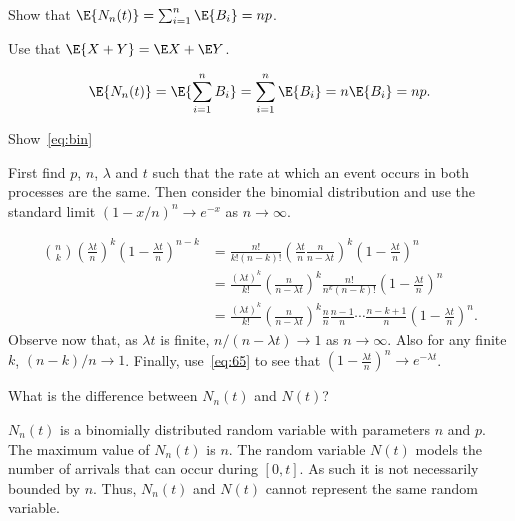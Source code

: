 \begin{exercise}\label{ex:p1}
Show that $\E{N_n(t)} = \sum_{i=1}^n \E{B_i} = n p$.
\begin{hint}
Use that $\E{X+Y} = \E X + \E Y$.
\end{hint}
\begin{solution}
 \begin{equation*}
 \E{N_n(t)} = \E{\sum_{i=1}^n {B_i}} = \sum_{i=1}^n \E{B_i} = n \E{B_i} = n p.
 \end{equation*}
\end{solution}
\end{exercise}

\begin{exercise} \label{ex:31}
 Show~\cref{eq:bin}
\begin{hint}
 First find $p$, $n$, $\lambda$ and $t$ such that the rate at which an event occurs in both processes are the same.
 Then consider the binomial distribution and use the standard limit $(1-x/n)^n \to e^{-x}$ as $n\to \infty$.
\end{hint}
\begin{solution}
 \begin{align*}
 {n \choose k} \left(\frac{\lambda t}{n}\right)^k \left(1-\frac{\lambda t}n\right)^{n-k}
&= \frac{n!}{k!(n-k)!} \left(\frac{\lambda t}{n}\frac{n}{n-\lambda t}\right)^k \left(1-\frac{\lambda t}n\right)^{n} \\
&= \frac{(\lambda t)^k}{k!} \left(\frac n{n-\lambda t} \right)^k \frac{n!}{n^k(n-k)!}\left(1-\frac{\lambda t}n\right)^{n}\\
&= \frac{(\lambda t)^k}{k!} \left(\frac n{n-\lambda t} \right)^k \frac{n}{n}\frac{n-1}{n}\cdots\frac{n-k+1}{n} \left(1-\frac{\lambda t}n\right)^{n}.
\end{align*}
Observe now that, as $\lambda t$ is finite, $n/(n-\lambda t)\to 1$ as
$n\to \infty$. Also for any finite $k$, $(n-k)/n\to1$. Finally, use~\cref{eq:65} to see that
$\left(1-\frac{\lambda t}n\right)^{n} \to e^{-\lambda t}$.

\end{solution}
\end{exercise}


\begin{exercise}\label{ex:p2}
What is the difference between $N_n(t)$ and $N(t)$?
\begin{solution}
 $N_n(t)$ is a binomially distributed random variable with parameters $n$ and $p$.
 The maximum value of $N_n(t)$ is $n$.
 The random variable $N(t)$ models the number of arrivals that can occur during $[0,t]$.
 As such it is not necessarily bounded by $n$.
 Thus, $N_n(t)$ and $N(t)$ cannot represent the same random variable.
\end{solution}
\end{exercise}


